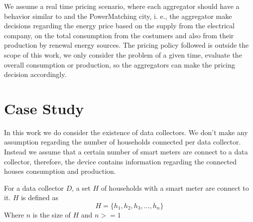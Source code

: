 We assume a real time pricing scenario, where each aggregator should have a behavior similar to \cite{lin2014designing} and the PowerMatching city, i. e., the aggregator make decisions regarding the energy price based on the supply from the electrical company, on the total consumption from the costumers and  also from their production by renewal energy sources. The pricing policy followed is outside the scope of this work, we only consider the problem of a given time, evaluate the overall consumption or production, so the aggregators can make the pricing decision accordingly.\\ 

\section{Case Study}
In this work we do consider the existence of data collectors. We don't make any assumption regarding the number of households connected per data collector. Instead we assume that a certain number of smart meters are connect to a data collector, therefore, the device contains information regarding the connected houses consumption and production. 
\begin{definition}
For a data collector $D$, a set $H$ of households with a smart meter are connect to it. $H$ is defined as
\begin{equation*}
H = \{ h_1,h_2,h_3, \dots , h_n \}
\end{equation*}
Where $n$ is the size of $H$ and $n >= 1$
\end{definition}

